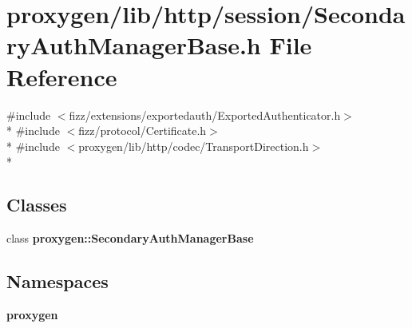 \section{proxygen/lib/http/session/\+Secondary\+Auth\+Manager\+Base.h File Reference}
\label{SecondaryAuthManagerBase_8h}
{\ttfamily \#include $<$fizz/extensions/exportedauth/\+Exported\+Authenticator.\+h$>$}\\*
{\ttfamily \#include $<$fizz/protocol/\+Certificate.\+h$>$}\\*
{\ttfamily \#include $<$proxygen/lib/http/codec/\+Transport\+Direction.\+h$>$}\\*
\subsection*{Classes}
\begin{DoxyCompactItemize}
\item 
class {\bf proxygen\+::\+Secondary\+Auth\+Manager\+Base}
\end{DoxyCompactItemize}
\subsection*{Namespaces}
\begin{DoxyCompactItemize}
\item 
 {\bf proxygen}
\end{DoxyCompactItemize}
